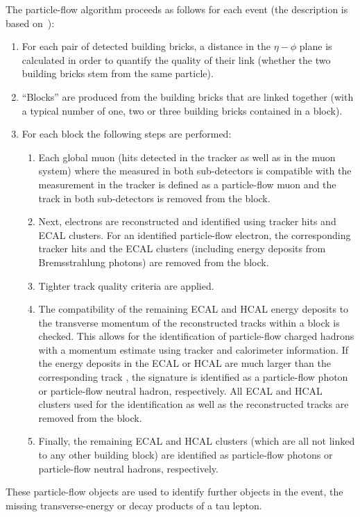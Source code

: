 The particle-flow algorithm proceeds as follows for each event (the description is based on~\cite{CMS-PAS-PFT-09-001}):
\begin{enumerate}
\item For each pair of detected building bricks, a distance in the $\eta-\phi$ plane is calculated in order to quantify the quality of their link (whether the two building bricks stem from the same particle). 
\item ``Blocks'' are produced from the building bricks that are linked together (with a typical number of one, two or three building bricks contained in a block).
\item For each block the following steps are performed:
\begin{enumerate}
\item Each global muon (hits detected in the tracker as well as in the muon system) where the \pt measured in both sub-detectors is compatible with the  \pt  measurement in the tracker is defined as a particle-flow muon and the track in both sub-detectors is removed from the block.
\item Next, electrons are reconstructed and identified using tracker hits and ECAL clusters. 
      For an identified particle-flow electron, the corresponding tracker hits and the ECAL clusters (including energy deposits from Bremsstrahlung photons) are removed from the block. 
\item Tighter track quality criteria are applied.
\item The compatibility of the remaining ECAL and HCAL energy deposits to the transverse momentum of the reconstructed tracks within a block is checked. 
      This allows for the identification of particle-flow charged hadrons with a momentum estimate using tracker and calorimeter information. 
      If the energy deposits in the ECAL or HCAL are much larger than the corresponding track \pt, the signature is identified as a particle-flow photon or particle-flow neutral hadron, respectively. 
      All ECAL and HCAL clusters used for the identification as well as the reconstructed tracks are removed from the block.
\item Finally, the remaining ECAL and HCAL clusters (which are all not linked to any other building block) are identified as particle-flow photons or particle-flow neutral hadrons, respectively.
\end{enumerate}
\end{enumerate}
These particle-flow objects are used to identify further objects in the event, \eg the missing transverse-energy or decay products of a tau lepton.

